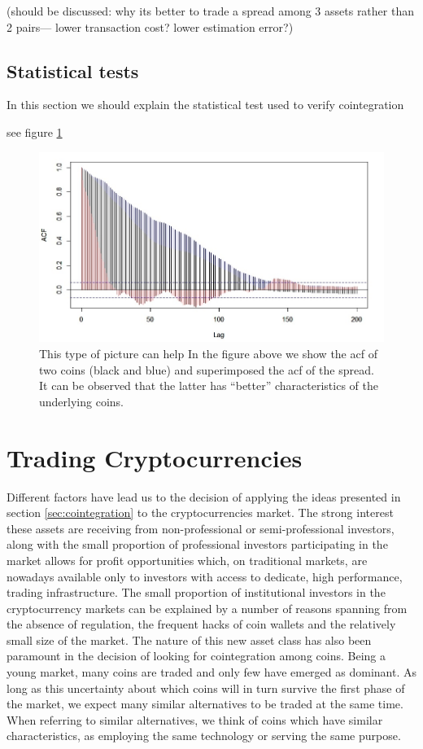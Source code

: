 \documentclass[a4paper,11pt]{article}
\theoremstyle{remark}
\theoremstyle{plain}
\newcommand\ab[1]{{\color{blue} #1 }}
\begin{document}
\ab{(should be discussed: why its better to trade a spread among 3 assets rather than 2 pairs--- lower transaction cost? lower estimation error?) }

\subsection{Statistical tests}
 
\ab{In this section we should explain the statistical test used to verify cointegration}

see figure \ref{f:acf}

\begin{figure}
\centering
\includegraphics[scale=0.5]{acf_comparison.jpeg}
\caption{\ab{This type of picture can help}In the figure above we show the acf of two coins (black and blue) and superimposed the acf of the spread. It can be observed that the latter has ``better'' characteristics of the underlying coins.} 
\label{f:acf}
\end{figure}

\section{Trading Cryptocurrencies}
\label{sec:cryptos}

Different factors have lead us to the decision of applying the ideas presented in section \ref{sec:cointegration} to the cryptocurrencies market. The strong interest these assets are receiving from non-professional or semi-professional investors, along with the small proportion of professional investors participating in the market allows for profit opportunities which, on traditional markets, are nowadays available only to investors with access to dedicate, high performance, trading infrastructure. The small proportion of institutional investors in the cryptocurrency markets can be explained by a number of reasons spanning from the absence of regulation, the frequent hacks of coin wallets and the relatively small size of the market. The nature of this new asset class has also been paramount in the decision of looking for cointegration among coins. Being a young market, many coins are traded and only few have emerged as dominant. As long as this uncertainty about which coins will in turn survive the first phase of the market, we expect many similar alternatives to be traded at the same time. When referring to similar alternatives, we think of coins which have similar characteristics, as employing the same technology or serving the same purpose.
\end{document}

